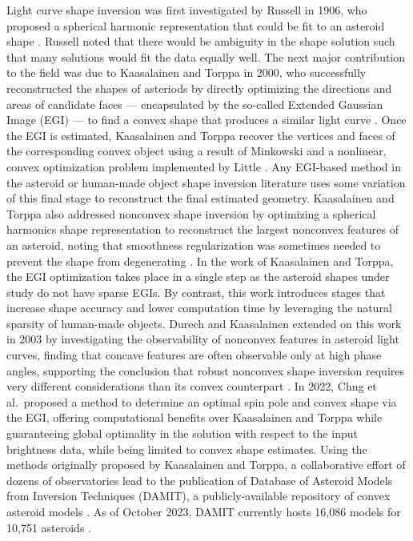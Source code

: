 Light curve shape inversion was first investigated by Russell in 1906, who proposed a spherical harmonic representation that could be fit to an asteroid shape \cite{russell1906}. Russell noted that there would be ambiguity in the shape solution such that many solutions would fit the data equally well. The next major contribution to the field was due to Kaasalainen and Torppa in 2000, who successfully reconstructed the shapes of asteriods by directly optimizing the directions and areas of candidate faces --- encapsulated by the so-called Extended Gaussian Image (EGI) --- to find a convex shape that produces a similar light curve \cite{kaasalainen2000, kaasalainen2001}. Once the EGI is estimated, Kaasalainen and Torppa recover the vertices and faces of the corresponding convex object using a result of Minkowski and a nonlinear, convex optimization problem implemented by Little \cite{minkowski1909, little1983}. Any EGI-based method in the asteroid or human-made object shape inversion literature uses some variation of this final stage to reconstruct the final estimated geometry. Kaasalainen and Torppa also addressed nonconvex shape inversion by optimizing a spherical harmonics shape representation to reconstruct the largest nonconvex features of an asteroid, noting that smoothness regularization was sometimes needed to prevent the shape from degenerating \cite{kaasalainen2000}. In the work of Kaasalainen and Torppa, the EGI optimization takes place in a single step as the asteroid shapes under study do not have sparse EGIs. By contrast, this work introduces stages that increase shape accuracy and lower computation time by leveraging the natural sparsity of human-made objects. Durech and Kaasalainen extended on this work in 2003 by investigating the observability of nonconvex features in asteroid light curves, finding that concave features are often observable only at high phase angles, supporting the conclusion that robust nonconvex shape inversion requires very different considerations than its convex counterpart \cite{durech2003}. In 2022, Chng et al.\ proposed a method to determine an optimal spin pole and convex shape via the EGI, offering computational benefits over Kaasalainen and Torppa while guaranteeing global optimality in the solution with respect to the input brightness data, while being limited to convex shape estimates\cite{chng2022}. Using the methods originally proposed by Kaasalainen and Torppa, a collaborative effort of dozens of observatories lead to the publication of Database of Asteroid Models from Inversion Techniques (DAMIT), a publicly-available repository of convex asteroid models \cite{durech2010}. As of October 2023, DAMIT currently hosts 16,086 models for 10,751 asteroids \cite{damit2014}.

